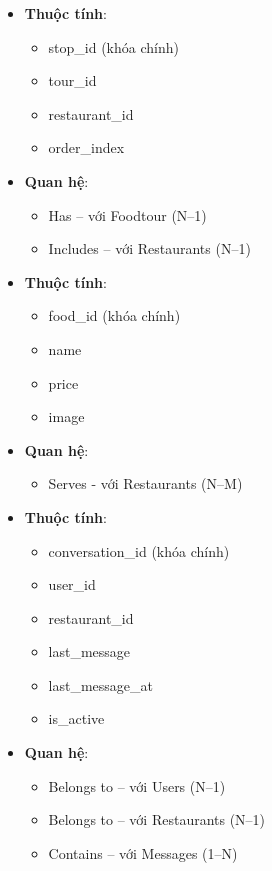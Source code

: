 \begin{itemize}[label=\textbullet]
    \item \textbf{Thuộc tính}:
    \begin{itemize}
        \item stop\_id (khóa chính)
        \item tour\_id
        \item restaurant\_id
        \item order\_index
    \end{itemize}
    \item \textbf{Quan hệ}:
    \begin{itemize}
        \item Has – với Foodtour (N--1)
        \item Includes – với Restaurants (N--1)
    \end{itemize}
\end{itemize}

\begin{itemize}[label=\textbullet]
    \item \textbf{Thuộc tính}:
    \begin{itemize}
        \item food\_id (khóa chính)
        \item name
        \item price
        \item image
    \end{itemize}
    \item \textbf{Quan hệ}:
    \begin{itemize}
        \item Serves - với Restaurants (N--M)
    \end{itemize}
\end{itemize}


\begin{itemize}[label=\textbullet]
    \item \textbf{Thuộc tính}:
    \begin{itemize}
        \item conversation\_id (khóa chính)
        \item user\_id
        \item restaurant\_id
        \item last\_message
        \item last\_message\_at
        \item is\_active
    \end{itemize}

    \item \textbf{Quan hệ}:
    \begin{itemize}
        \item Belongs to -- với Users (N--1)
        \item Belongs to -- với Restaurants (N--1)
        \item Contains -- với Messages (1--N)
    \end{itemize}
\end{itemize}

